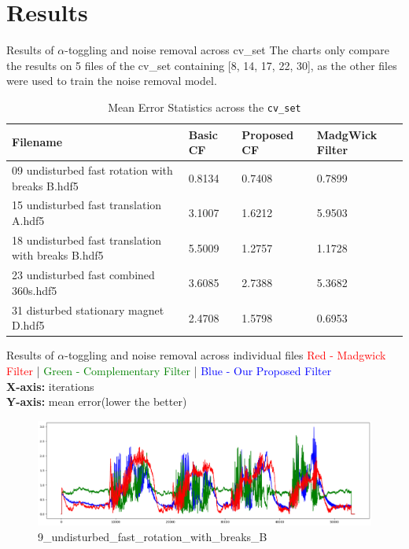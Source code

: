 \documentclass[aspectratio=169,xcolor=dvipsnames]{beamer}
\begin{document}
\section{Results}

\begin{frame}{Results of $\alpha$-toggling and noise removal across cv_set}
\small
The charts only compare the results on 5 files of the cv\_set containing [8, 14, 17, 22, 30], as the other files were used to train the noise removal model.
\begin{table}[H]
\centering
\caption{Mean Error Statistics across the \texttt{cv\_set}}
\label{tab:error_statistics_cvset_mean}
    \begin{tabular}{|p{}|p{}|p{}|p{}|}
    \hline
    \textbf{Filename} & \textbf{Basic CF} & \textbf{Proposed CF} & \textbf{ MadgWick Filter} \\
    \hline
    09 undisturbed fast rotation with breaks B.hdf5 & 0.8134 & 0.7408 & 0.7899 \\
    \hline
    15 undisturbed fast translation A.hdf5 & 3.1007 & 1.6212 & 5.9503 \\
    \hline
    18 undisturbed fast translation with breaks B.hdf5 & 5.5009 & 1.2757 & 1.1728 \\
    \hline
    23 undisturbed fast combined 360s.hdf5 & 3.6085 & 2.7388 & 5.3682 \\
    \hline
    31 disturbed stationary magnet D.hdf5 & 2.4708 & 1.5798 & 0.6953 \\
    \hline
    \end{tabular}
\end{table}
    
\end{frame}

\begin{frame}{Results of $\alpha$-toggling and noise removal across individual files}
\small
\textcolor{red}{Red - Madgwick Filter} | \textcolor{green}{Green - Complementary Filter} | \textcolor{blue}{Blue - Our Proposed Filter} \\ 
\textbf{X-axis:} iterations \\ \textbf{Y-axis:} mean error(lower the better)

\begin{figure}
    \centering
    \includegraphics[width=1\linewidth]{logos/9_undisturbed_fast_rotation_with_breaks_B.png}
    \caption{9\_undisturbed\_fast\_rotation\_with\_breaks\_B}
    \label{fig:9_undisturbed_fast_rotation}
\end{figure}
\hfill
\end{frame}
\end{document}

